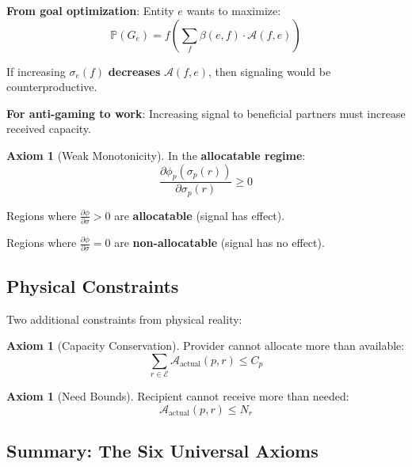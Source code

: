 \documentclass[11pt,a4paper]{article}
\theoremstyle{definition}
\newtheorem{axiom}[theorem]{Axiom}
\theoremstyle{remark}
\newcommand{\E}{\mathcal{E}}
\begin{document}
\textbf{From goal optimization}: Entity $e$ wants to maximize:
\[ \mathbb{P}(G_e) = f\left(\sum_f \beta(e,f) \cdot \mathcal{A}(f,e)\right) \]

If increasing $\sigma_e(f)$ \textbf{decreases} $\mathcal{A}(f,e)$, then signaling would be counterproductive.

\textbf{For anti-gaming to work}: Increasing signal to beneficial partners must increase received capacity.

\begin{axiom}[Weak Monotonicity]
In the \textbf{allocatable regime}:
\[ \frac{\partial \phi_p(\sigma_p(r))}{\partial \sigma_p(r)} \ge 0 \]

Regions where $\frac{\partial \phi}{\partial \sigma} > 0$ are \textbf{allocatable} (signal has effect).

Regions where $\frac{\partial \phi}{\partial \sigma} = 0$ are \textbf{non-allocatable} (signal has no effect).
\end{axiom}

\subsection{Physical Constraints}

Two additional constraints from physical reality:

\begin{axiom}[Capacity Conservation]
Provider cannot allocate more than available:
\[ \sum_{r \in \E} \mathcal{A}_{\text{actual}}(p,r) \le C_p \]
\end{axiom}

\begin{axiom}[Need Bounds]
Recipient cannot receive more than needed:
\[ \mathcal{A}_{\text{actual}}(p,r) \le N_r \]
\end{axiom}

\subsection{Summary: The Six Universal Axioms}
\end{document}
